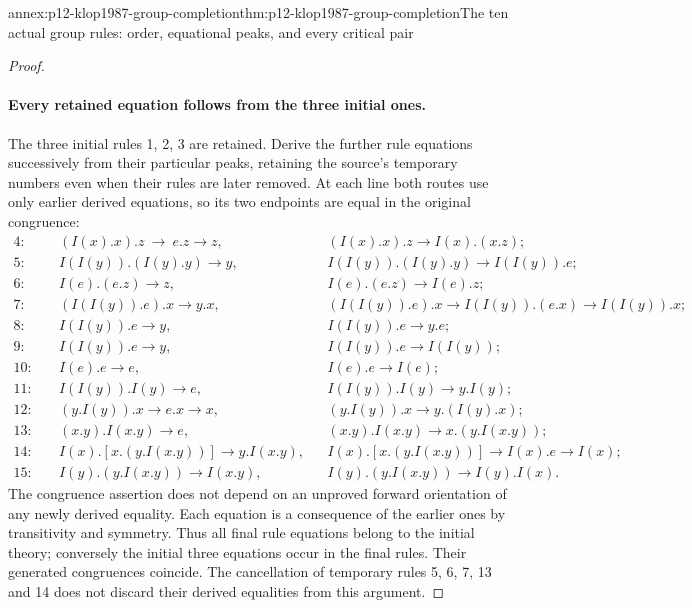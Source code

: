 \begin{annexitem}{annex:p12-klop1987-group-completion}{thm:p12-klop1987-group-completion}{The ten actual group rules: order, equational peaks, and every critical pair}
\begin{proof}
\paragraph{Every retained equation follows from the three initial ones.}
The three initial rules 1, 2, 3 are retained. Derive the further rule
equations successively from their particular peaks, retaining the
source's temporary numbers even when their rules are later removed.
At each line both routes use only earlier derived equations, so its
two endpoints are equal in the original congruence:
\begin{align*}
4:\quad &(I(x).x).z \ \longrightarrow\ e.z\longrightarrow z,
 & &(I(x).x).z\longrightarrow I(x).(x.z);\\
5:\quad &I(I(y)).(I(y).y)\longrightarrow y,
 & &I(I(y)).(I(y).y)\longrightarrow I(I(y)).e;\\
6:\quad &I(e).(e.z)\longrightarrow z,
 & &I(e).(e.z)\longrightarrow I(e).z;\\
7:\quad &(I(I(y)).e).x\longrightarrow y.x,
 & &(I(I(y)).e).x\longrightarrow I(I(y)).(e.x)
     \longrightarrow I(I(y)).x;\\
8:\quad &I(I(y)).e\longrightarrow y,
 & &I(I(y)).e\longrightarrow y.e;\\
9:\quad &I(I(y)).e\longrightarrow y,
 & &I(I(y)).e\longrightarrow I(I(y));\\
10:\quad &I(e).e\longrightarrow e,
 & &I(e).e\longrightarrow I(e);\\
11:\quad &I(I(y)).I(y)\longrightarrow e,
 & &I(I(y)).I(y)\longrightarrow y.I(y);\\
12:\quad &(y.I(y)).x\longrightarrow e.x\longrightarrow x,
 & &(y.I(y)).x\longrightarrow y.(I(y).x);\\
13:\quad &(x.y).I(x.y)\longrightarrow e,
 & &(x.y).I(x.y)\longrightarrow x.(y.I(x.y));\\
14:\quad &I(x).[x.(y.I(x.y))]\longrightarrow y.I(x.y),
 & &I(x).[x.(y.I(x.y))]\longrightarrow I(x).e
     \longrightarrow I(x);\\
15:\quad &I(y).(y.I(x.y))\longrightarrow I(x.y),
 & &I(y).(y.I(x.y))\longrightarrow I(y).I(x).
\end{align*}
The congruence assertion does not depend on an unproved forward
orientation of any newly derived equality. Each equation is a
consequence of the earlier ones by transitivity and symmetry.
Thus all final rule equations belong to the initial theory; conversely
the initial three equations occur in the final rules. Their generated
congruences coincide. The cancellation of temporary rules 5, 6, 7,
13 and 14 does not discard their derived equalities from this argument.


\end{proof}
\end{annexitem}
